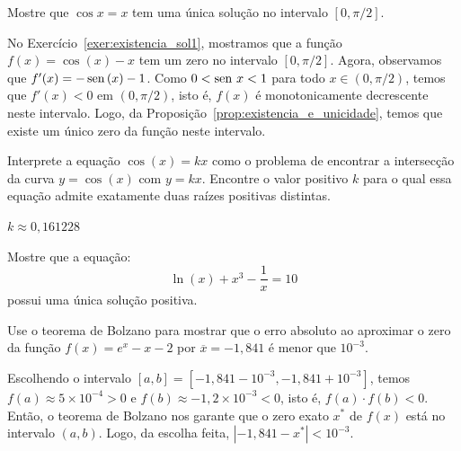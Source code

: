 \begin{ex}
\begin{resp}
\end{resp}

\begin{exer}
  Mostre que $\cos x = x$ tem uma única solução no intervalo $[0, \pi/2]$.
\end{exer}
\begin{resp}

    No Exercício~\ref{exer:existencia_sol1}, mostramos que a função $f(x) = \cos(x) - x$ tem um zero no intervalo $[0, \pi/2]$. Agora, observamos que $f'(x) = -\operatorname{sen}\,(x) - 1$. Como $0 < \operatorname{sen}\, x < 1$ para todo $x\in (0, \pi/2)$, temos que $f'(x) < 0$ em $(0, \pi/2)$, isto é, $f(x)$ é monotonicamente decrescente neste intervalo. Logo, da Proposição~\ref{prop:existencia_e_unicidade}, temos que existe um único zero da função neste intervalo.

\end{resp}

\begin{exer} Interprete a equação $\cos(x)=kx$ como o problema de encontrar a intersecção da curva $y=\cos(x)$ com $y=kx$. Encontre o valor positivo $k$ para o qual essa equação admite exatamente duas raízes positivas distintas.
\end{exer}
\begin{resp}

    $k\approx 0,161228$

\end{resp}


\begin{exer}Mostre que a equação:
  \begin{equation}
    \ln(x)+x^3-\frac{1}{x}=10
  \end{equation}
possui uma única solução positiva.
\end{exer}

\begin{exer}\label{exer:teorema_de_Bolzano_exatidao} Use o teorema de Bolzano para mostrar que o erro absoluto ao aproximar o zero da função $f(x)=e^x-x-2$ por $\overline{x}=-1,841$ é menor que $10^{-3}$.
\end{exer}
\begin{resp}

    Escolhendo o intervalo $[a, b] = [-1,841-10^{-3}, -1,841+10^{-3}]$, temos $f(a)\approx 5\times 10^{-4} > 0$ e $f(b)\approx -1,2\times 10^{-3} < 0$, isto é, $f(a)\cdot f(b) < 0$. Então, o teorema de Bolzano nos garante que o zero exato $x^*$ de $f(x)$ está no intervalo $(a, b)$. Logo, da escolha feita, $|-1,841 - x^*| < 10^{-3}$.


\end{resp}
\end{ex}
